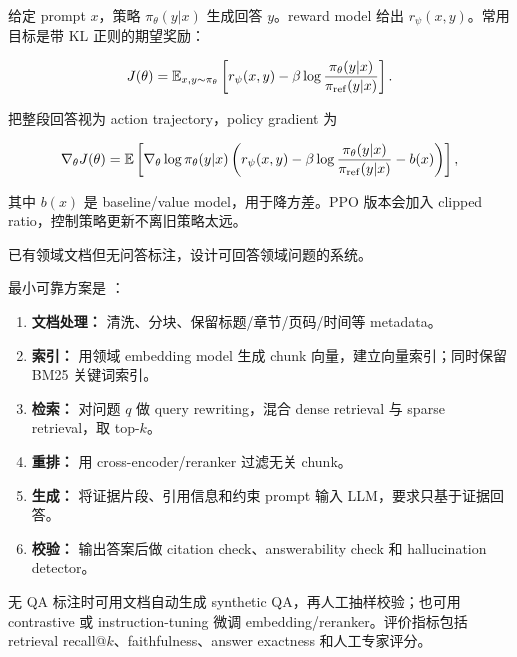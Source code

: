 给定 prompt \(x\)，策略 \(\pi_\theta(y|x)\) 生成回答 \(y\)。reward model 给出 \(r_\psi(x,y)\)。常用目标是带 KL 正则的期望奖励：

\[
  J(\theta)
  =
  \mathbb{E}_{x,y\sim \pi_\theta}
  \left[
    r_\psi(x,y)
    -
    \beta
    \log\frac{\pi_\theta(y|x)}{\pi_{\mathrm{ref}}(y|x)}
  \right].
\]

把整段回答视为 action trajectory，policy gradient 为

\[
  \nabla_\theta J(\theta)
  =
  \mathbb{E}
  \left[
    \nabla_\theta\log \pi_\theta(y|x)
    \left(
      r_\psi(x,y)
      -
      \beta\log\frac{\pi_\theta(y|x)}{\pi_{\mathrm{ref}}(y|x)}
      -
      b(x)
    \right)
  \right],
\]

其中 \(b(x)\) 是 baseline/value model，用于降方差。PPO 版本会加入 clipped ratio，控制策略更新不离旧策略太远。

\begin{examproblem}
已有领域文档但无问答标注，设计可回答领域问题的系统。
\end{examproblem}

\solution
最小可靠方案是 ：

\begin{enumerate}
  \item \textbf{文档处理：} 清洗、分块、保留标题/章节/页码/时间等 metadata。
  \item \textbf{索引：} 用领域 embedding model 生成 chunk 向量，建立向量索引；同时保留 BM25 关键词索引。
  \item \textbf{检索：} 对问题 \(q\) 做 query rewriting，混合 dense retrieval 与 sparse retrieval，取 top-\(k\)。
  \item \textbf{重排：} 用 cross-encoder/reranker 过滤无关 chunk。
  \item \textbf{生成：} 将证据片段、引用信息和约束 prompt 输入 LLM，要求只基于证据回答。
  \item \textbf{校验：} 输出答案后做 citation check、answerability check 和 hallucination detector。
\end{enumerate}

无 QA 标注时可用文档自动生成 synthetic QA，再人工抽样校验；也可用 contrastive 或 instruction-tuning 微调 embedding/reranker。评价指标包括 retrieval recall@\(k\)、faithfulness、answer exactness 和人工专家评分。

